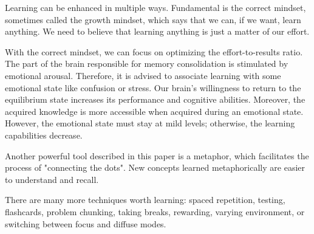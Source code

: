 \documentclass{article}
\begin{document}
Learning can be enhanced in multiple ways. Fundamental is the correct mindset, sometimes called the growth mindset, which says that we can, if we want, learn anything. We need to believe that learning anything is just a matter of our effort. 

With the correct mindset, we can focus on optimizing the effort-to-results ratio. The part of the brain responsible for memory consolidation is stimulated by emotional arousal. Therefore, it is advised to associate learning with some emotional state like confusion or stress. Our brain's willingness to return to the equilibrium state increases its performance and cognitive abilities. Moreover, the acquired knowledge is more accessible when acquired during an emotional state. However, the emotional state must stay at mild levels; otherwise, the learning capabilities decrease. 

Another powerful tool described in this paper is a metaphor, which facilitates the process of "connecting the dots". New concepts learned metaphorically are easier to understand and recall. 

There are many more techniques worth learning: spaced repetition, testing, flashcards, problem chunking, taking breaks, rewarding, varying environment, or switching between focus and diffuse modes. 



\end{document}
